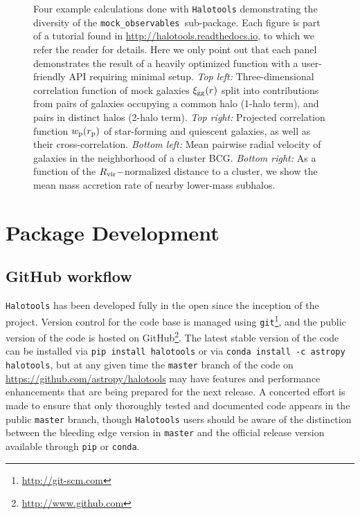 \documentclass[twocolumn, tighten]{aastex6}
\newcommand{\rproj}{r_{\rm p}}
\newcommand{\mockobs}{{\tt mock\_observables }}
\begin{document}
\begin{figure}
\begin{center}
\caption{
Four example calculations done with {\tt Halotools} demonstrating the diversity of the \mockobs sub-package. Each figure is part of a tutorial found in \url{http://halotools.readthedocs.io}, to which we refer the reader for details. Here we only point out that each panel demonstrates the result of a heavily optimized function with a user-friendly API requiring minimal setup. {\em Top left:} Three-dimensional correlation function of mock galaxies $\xi_{\rm gg}(r)$ split into contributions from pairs of galaxies occupying a common halo (1-halo term), and pairs in distinct halos (2-halo term). {\em Top right:} Projected correlation function $w_{\rm p}(\rproj)$ of star-forming and quiescent galaxies, as well as their cross-correlation. {\em Bottom left:} Mean pairwise radial velocity of galaxies in the neighborhood of a cluster BCG. {\em Bottom right:} As a function of the $R_{\rm vir}-$normalized distance to a cluster, we show the mean mass accretion rate of nearby lower-mass subhalos.
}
\label{fig:mockobs}
\end{center}
\end{figure}

\section{Package Development}
\label{section:development}

\subsection{GitHub workflow}
\label{subsection:githubworkflow}

{\tt Halotools} has been developed fully in the open since the inception of the project. Version control for the code base is managed using {\tt git}\footnote{\url{http://git-scm.com}}, and the public version of the code is hosted on GitHub\footnote{\url{http://www.github.com}}. The latest stable version of the code can be installed via {\tt pip install halotools} or via {\tt conda install -c astropy halotools}, but at any given time the {\tt master} branch of the code on \url{https://github.com/astropy/halotools} may have features and performance enhancements that are being prepared for the next release. A concerted effort is made to ensure that only thoroughly tested and documented code appears in the public {\tt master} branch, though {\tt Halotools} users should be aware of the distinction between the bleeding edge version in {\tt master} and the official release version available through {\tt pip} or {\tt conda}.
\end{document}
